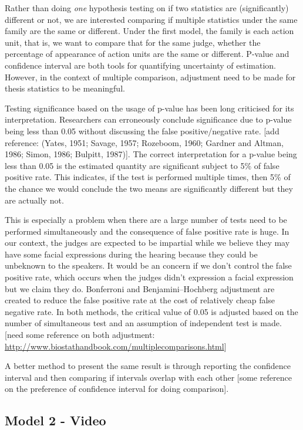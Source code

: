 \documentclass{monashthesis}
\begin{document}
Rather than doing \emph{one} hypothesis testing on if two statistics are (significantly) different or not, we are interested comparing if multiple statistics under the same family are the same or different. Under the first model, the family is each action unit, that is, we want to compare that for the same judge, whether the percentage of appearance of action units are the same or different. P-value and confidence interval are both tools for quantifying uncertainty of estimation. However, in the context of multiple comparison, adjustment need to be made for thesis statistics to be meaningful.

Testing significance based on the usage of p-value has been long criticised for its interpretation. Researchers can erroneously conclude significance due to p-value being less than 0.05 without discussing the false positive/negative rate. {[}add reference: (Yates, 1951; Savage, 1957; Rozeboom, 1960; Gardner and Altman, 1986; Simon, 1986; Bulpitt, 1987){]}. The correct interpretation for a p-value being less than 0.05 is the estimated quantity are significant subject to 5\% of false positive rate. This indicates, if the test is performed multiple times, then 5\% of the chance we would conclude the two means are significantly different but they are actually not.

This is especially a problem when there are a large number of tests need to be performed simultaneously and the consequence of false positive rate is huge. In our context, the judges are expected to be impartial while we believe they may have some facial expressions during the hearing because they could be unbeknown to the speakers. It would be an concern if we don't control the false positive rate, which occurs when the judges didn't expression a facial expression but we claim they do. Bonferroni and Benjamini--Hochberg adjustment are created to reduce the false positive rate at the cost of relatively cheap false negative rate. In both methods, the critical value of 0.05 is adjusted based on the number of simultaneous test and an assumption of independent test is made. {[}need some reference on both adjustment: \url{http://www.biostathandbook.com/multiplecomparisons.html}{]}

A better method to present the same result is through reporting the confidence interval and then comparing if intervals overlap with each other {[}some reference on the preference of confidence interval for doing comparison{]}.

\hypertarget{model-2---video}{%
\subsection{Model 2 - Video}\label{model-2---video}}
\end{document}

